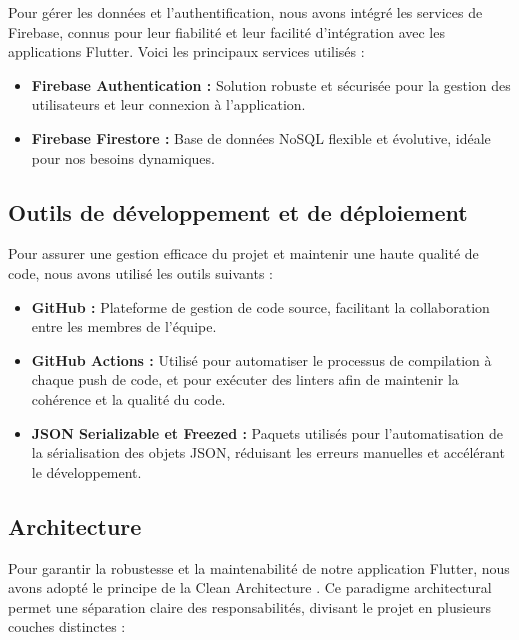 Pour gérer les données et l'authentification, nous avons intégré les services de Firebase, connus pour leur fiabilité et leur facilité d'intégration avec les applications Flutter. Voici les principaux services utilisés :

\begin{itemize}[noitemsep]
    \item \textbf{Firebase Authentication :} Solution robuste et sécurisée pour la gestion des utilisateurs et leur connexion à l'application.
    \item \textbf{Firebase Firestore :} Base de données NoSQL flexible et évolutive, idéale pour nos besoins dynamiques.
\end{itemize}

\subsection{Outils de développement et de déploiement}

Pour assurer une gestion efficace du projet et maintenir une haute qualité de code, nous avons utilisé les outils suivants :

\begin{itemize}[noitemsep]
    \item \textbf{GitHub :} Plateforme de gestion de code source, facilitant la collaboration entre les membres de l'équipe.
    \item \textbf{GitHub Actions :} Utilisé pour automatiser le processus de compilation à chaque push de code, et pour exécuter des linters afin de maintenir la cohérence et la qualité du code.
    \item \textbf{JSON Serializable et Freezed :} Paquets utilisés pour l'automatisation de la sérialisation des objets JSON, réduisant les erreurs manuelles et accélérant le développement.
\end{itemize}

\subsection{Architecture}

Pour garantir la robustesse et la maintenabilité de notre application Flutter, nous avons adopté le principe de la Clean Architecture \cite{cleanArchitecture}. Ce paradigme architectural permet une séparation claire des responsabilités, divisant le projet en plusieurs couches distinctes :


